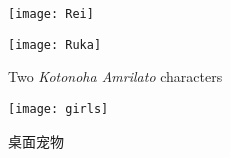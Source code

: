 \begin{figure}[h!]
    \centering
    \begin{minipage}{0.3\textwidth}
        \texttt{[image: Rei]}
    \end{minipage}
    \hspace{0.15\textwidth}
    \begin{minipage}{0.3\textwidth}
        \texttt{[image: Ruka]}
    \end{minipage}
    \caption{Two \textit{Kotonoha Amrilato} characters}
\end{figure}

\begin{figure}[h!]
    \centering
    \texttt{[image: girls]}
    \caption{桌面宠物}
    \label{fig:girls}
\end{figure}
